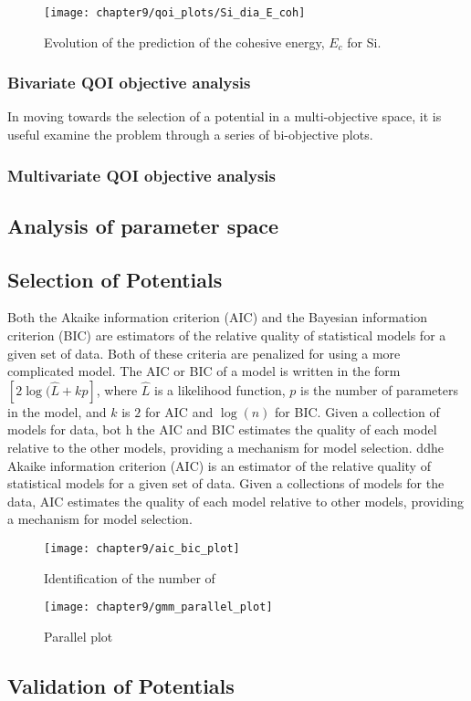 \begin{figure}
	\centering
	\captionsetup{justification=centering,margin=1in}
	\texttt{[image: chapter9/qoi\_plots/Si\_dia\_E\_coh]}
	\caption{Evolution of the prediction of the cohesive energy, $E_c$ for Si.}
	\label{fig:Si_qoi_E_coh}
\end{figure}
\subsubsection{Bivariate QOI objective analysis}
In moving towards the selection of a potential in a multi-objective space, it is useful examine the problem through a series of bi-objective plots.

\subsubsection{Multivariate QOI objective analysis}

\subsection{Analysis of parameter space}
\subsection{Selection of Potentials}

Both the Akaike information criterion (AIC)\cite{akaike1998_aic} and the Bayesian information criterion (BIC) \cite{schwarz1978_bic}
are estimators of the relative quality of statistical models for a given set of data.
Both of these criteria are penalized for using a more complicated model.  The AIC or BIC of a model is written in the form $[2\log(\hat{L}+kp]$, where $\hat{L}$ is a likelihood function, $p$ is the number of parameters in the model, and $k$ is $2$ for AIC and $\log(n)$ for BIC.
Given a collection of models for data, bot h the AIC and BIC estimates the quality of each model relative to the other models, providing a mechanism for model selection.
ddhe Akaike information criterion (AIC) \cite{akaike1998_aic} is an estimator of the relative quality of statistical models for a given set of data.   Given a collections of models for the data, AIC estimates the quality of each model relative to other models, providing a mechanism for model selection.


\begin{figure}
	\centering
	\captionsetup{justification=centering,margin=1in}
	\texttt{[image: chapter9/aic\_bic\_plot]}
	\caption{Identification of the number of }
	\label{fig:Si_Ec_a0_aic_bic}
\end{figure}

\begin{figure}[hbt]
	\centering
	\captionsetup{justification=centering,margin=1in}
	\texttt{[image: chapter9/gmm\_parallel\_plot]}
	\caption{Parallel plot}
	\label{fig:Si_gmm_parallel_plot_2_qoi}
\end{figure}

\subsection{Validation of Potentials}
